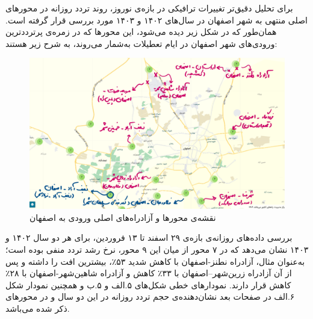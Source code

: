 \documentclass[a4paper, 12pt]{article}
\begin{document}
برای تحلیل دقیق‌تر تغییرات ترافیکی در بازه‌ی نوروز، روند تردد روزانه در محورهای اصلی منتهی به شهر اصفهان در سال‌های ۱۴۰۲ و ۱۴۰۳ مورد بررسی قرار گرفته است. همان‌طور که در شکل زیر دیده می‌شود، این محورها که در زمره‌ی پرترددترین ورودی‌های شهر اصفهان در ایام تعطیلات به‌شمار می‌روند، به شرح زیر هستند:
\begin{figure}[htbp]
    \centering
    \includegraphics[width=1\textwidth]{pics/isfahan/isfahan_141.png}
    \caption{نقشه‌ی محورها و آزادراه‌های اصلی ورودی به اصفهان}
\end{figure}

\vspace{2em}
بررسی داده‌های روزانه‌ی بازه‌ی ۲۹ اسفند تا ۱۳ فروردین، برای هر دو سال ۱۴۰۲ و ۱۴۰۳ نشان می‌دهد که در ۷ محور از میان این ۹ محور، نرخ رشد تردد منفی بوده است؛ به‌عنوان مثال، آزادراه نطنز-اصفهان با کاهش شدید ۵۳٪، بیشترین افت را داشته و پس از آن آزادراه زرین‌شهر–اصفهان با ۳۳٪ کاهش و آزادراه شاهین‌شهر-اصفهان با ۲۸٪ کاهش قرار دارند.
نمودارهای خطی شکل‌های ۵.الف و ۵.ب و همچنین نمودار شکل ۶.الف در صفحات بعد نشان‌دهنده‌ی حجم تردد روزانه در این دو سال و در محورهای ذکر شده می‌باشد.
\end{document}
